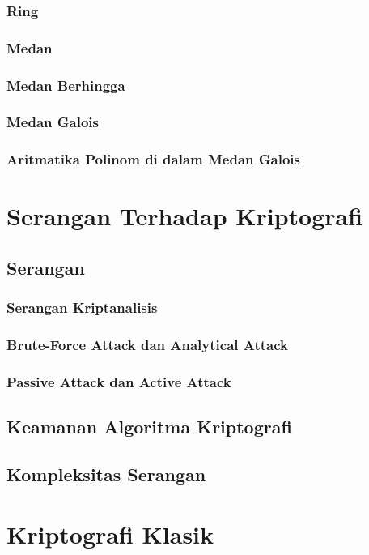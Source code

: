 \documentclass{book}
\begin{document}
         \subsection{Ring}
         \subsection{Medan}
         \subsection{Medan Berhingga}
         \subsection{Medan Galois}
         \subsection{Aritmatika Polinom di dalam Medan Galois}

\chapter{Serangan Terhadap Kriptografi}
    \section{Serangan}
        \subsection{Serangan Kriptanalisis}
        \subsection{Brute-Force Attack dan Analytical Attack}
        \subsection{Passive Attack dan Active Attack}
    \section{Keamanan Algoritma Kriptografi}
    \section{Kompleksitas Serangan}

\chapter{Kriptografi Klasik}
\end{document}
